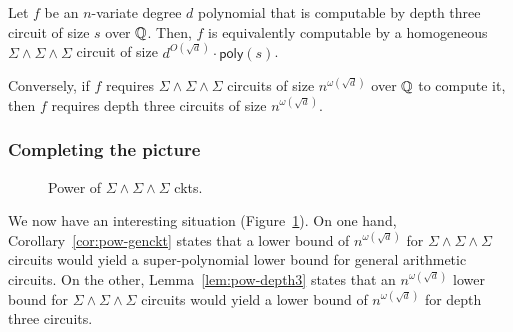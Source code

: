 \documentclass[12pt]{report}
\newcommand{\SPS}{\Sigma\Pi\Sigma}
\newcommand{\SESES}{\Sigma\!\wedge\!\Sigma\!\wedge\!\Sigma}
\newcommand{\poly}{\mathsf{poly}}
\begin{document}
\begin{lemma}\label{lem:pow-depth3}
Let $f$ be an $n$-variate degree $d$ polynomial that is computable by depth three circuit of size $s$ over $\mathbb{Q}$. Then, $f$ is equivalently computable by a homogeneous $\Sigma\!\wedge\!\Sigma\!\wedge\!\Sigma$ circuit of size $d^{O(\sqrt{d})}\cdot \poly(s)$. 

Conversely, if $f$ requires $\Sigma\!\wedge\!\Sigma\!\wedge\!\Sigma$ circuits of size $n^{\omega(\sqrt{d})}$ over $\mathbb{Q}$ to compute it, then $f$ requires depth three circuits of size $n^{\omega(\sqrt{d})}$. 
\end{lemma}

\subsubsection{Completing the picture}

\begin{figure}
\begin{center}
\end{center}
\caption{Power of $\SESES$ ckts.}
\label{fig:SESES}
\end{figure}


We now have an interesting situation (Figure~\ref{fig:SESES}). On one hand, Corollary~\ref{cor:pow-genckt} states that a lower bound of $n^{\omega(\sqrt{d})}$ for $\SESES$ circuits would yield a super-polynomial lower bound for general arithmetic circuits. On the other, Lemma~\ref{lem:pow-depth3} states that an $n^{\omega(\sqrt{d})}$ lower bound for $\SESES$ circuits would yield a lower bound of $n^{\omega(\sqrt{d})}$ for depth three circuits. 
\end{document}
